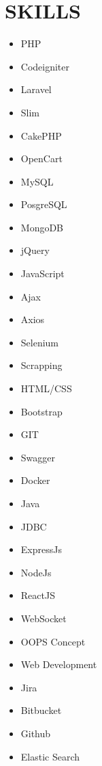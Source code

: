 \documentclass[letterpaper,11pt]{article}
\newcommand{\resumeSubHeadingListStart}{\begin{itemize}[leftmargin=0.0in, label={}]}
\newcommand{\resumeSubHeadingListEnd}{\end{itemize}}
\begin{document}
\section{SKILLS}
        \begin{multicols}{4}
            \begin{itemize}[itemsep=-2pt, parsep=5pt]
                \item PHP
                \item Codeigniter
                \item Laravel
                \item Slim
                \item CakePHP
                \item OpenCart
                \item MySQL
                \item PosgreSQL
                \item MongoDB
                \item jQuery
                \item JavaScript
                \item Ajax
                \item Axios
                \item Selenium
                \item Scrapping
                \item HTML/CSS
                \item Bootstrap
                \item GIT
                \item Swagger
                \item Docker
                \item Java
                \item JDBC
                \item ExpressJs
                \item NodeJs
                \item ReactJS
                \item WebSocket
                \item OOPS Concept
                \item Web Development
                \item Jira
                \item Bitbucket
                \item Github
                \item Elastic Search
            \end{itemize}
        \end{multicols}
        \vspace{7pt}
        \vspace*{2.0\multicolsep}
\end{document}
